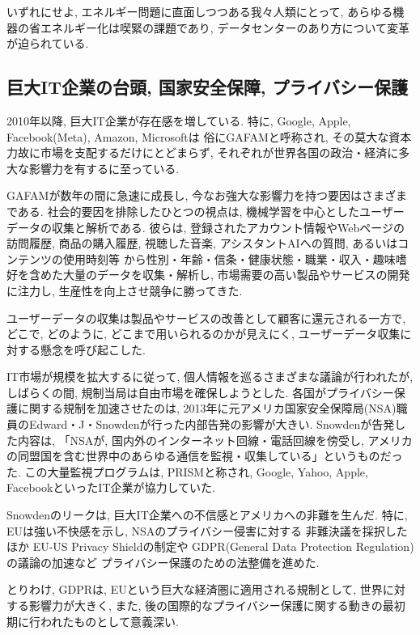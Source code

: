 いずれにせよ, エネルギー問題に直面しつつある我々人類にとって, 
あらゆる機器の省エネルギー化は喫緊の課題であり, データセンターのあり方について変革が迫られている.
\subsection*{巨大IT企業の台頭, 国家安全保障, プライバシー保護}
2010年以降,  巨大IT企業が存在感を増している.
特に, Google, Apple, Facebook(Meta), Amazon, Microsoftは
俗にGAFAMと呼称され, その莫大な資本力故に市場を支配するだけにとどまらず, 
それぞれが世界各国の政治・経済に多大な影響力を有するに至っている.

GAFAMが数年の間に急速に成長し, 
今なお強大な影響力を持つ要因はさまざまである.
社会的要因を排除したひとつの視点は, 機械学習を中心としたユーザーデータの収集と解析である.
彼らは, 登録されたアカウント情報やWebページの訪問履歴, 商品の購入履歴, 
視聴した音楽, アシスタントAIへの質問, あるいはコンテンツの使用時刻等
から性別・年齢・信条・健康状態・職業・収入・趣味嗜好を含めた大量のデータを収集・解析し, 
市場需要の高い製品やサービスの開発に注力し, 生産性を向上させ競争に勝ってきた.

ユーザーデータの収集は製品やサービスの改善として顧客に還元される一方で, 
どこで, どのように, どこまで用いられるのかが見えにく, ユーザーデータ収集に対する懸念を呼び起こした.

IT市場が規模を拡大するに従って, 個人情報を巡るさまざまな議論が行われたが, 
しばらくの間, 規制当局は自由市場を確保しようとした.
各国がプライバシー保護に関する規制を加速させたのは, 
2013年に元アメリカ国家安全保障局(NSA)職員のEdward・J・Snowdenが行った内部告発の影響が大きい.
Snowdenが告発した内容は, 
「NSAが, 国内外のインターネット回線・電話回線を傍受し, アメリカの同盟国を含む世界中のあらゆる通信を監視・収集している」というものだった.
この大量監視プログラムは, PRISMと称され,
Google, Yahoo, Apple, FacebookといったIT企業が協力していた.

Snowdenのリークは, 巨大IT企業への不信感とアメリカへの非難を生んだ.
特に, EUは強い不快感を示し, 
NSAのプライバシー侵害に対する
非難決議を採択したほか 
EU-US Privacy Shieldの制定や
GDPR(General Data Protection Regulation)の議論の加速など
プライバシー保護のための法整備を進めた\cite{GDPRsnowden}.

とりわけ, GDPRは, 
EUという巨大な経済圏に適用される規制として, 世界に対する影響力が大きく, 
また, 後の国際的なプライバシー保護に関する動きの最初期に行われたものとして意義深い.

